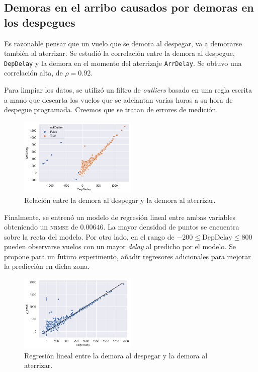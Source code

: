 \subsection{Demoras en el arribo causados por demoras en los despegues}%
\label{sub:dep_arr_delay}

Es razonable pensar que un vuelo que se demora al despegar, va a demorarse
también al aterrizar. Se estudió la correlación entre la demora al despegue,
\texttt{DepDelay} y la demora en el momento del aterrizaje \texttt{ArrDelay}.
Se obtuvo una correlación alta, de $\rho=0.92$.

Para limpiar los datos, se utilizó un filtro de \textit{outliers} basado en una
regla escrita a mano que descarta los vuelos que se adelantan varias horas a su
hora de despegue programada. Creemos que se tratan de errores de medición.

\begin{figure}[h]
\centering
\includegraphics[width=0.5\textwidth]{img/dep_arr_delay_outliers_a_mano.png}
\caption{Relación entre la demora al despegar y la demora al aterrizar.}
\end{figure}

Finalmente, se entrenó un modelo de regresión lineal entre ambas variables obteniendo un \textsc{nrmse} de $0.00646$.
La mayor densidad de puntos se encuentra sobre la
recta del modelo.
Por otro lado, en el rango de $-200 \leq \mathrm{DepDelay} \leq 800$ pueden observarse vuelos con un mayor
\textit{delay} al predicho por el modelo. Se propone para un futuro
experimento, añadir regresores adicionales para mejorar la predicción en dicha zona.

\begin{figure}[h]
\centering
\includegraphics[width=0.5\textwidth]{img/dep_arr_delay_regplot.png}
\caption{Regresión lineal entre la demora al despegar y la demora al aterrizar.}
\end{figure}

